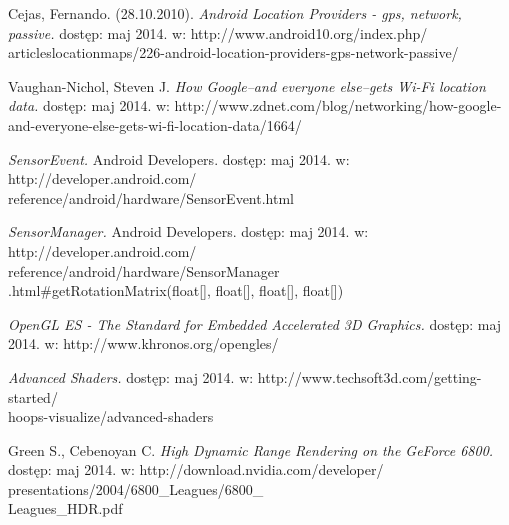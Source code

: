 \documentclass[a4paper,twocolumn,11pt]{article}
\begin{document}
\begin{thebibliography}{9}
 \small

  Cejas, Fernando.
                   (28.10.2010).
                   \emph{Android Location Providers - gps, network, passive.}
                   dostęp: maj 2014.
                   w: http://www.android10.org/index.php/\\articleslocationmaps/226-android-location-providers-gps-network-passive/
 
  Vaughan-Nichol, Steven J.
                    \emph{How Google--and everyone else--gets Wi-Fi location data.}
                    dostęp: maj 2014.
                    w: http://www.zdnet.com/blog/networking/how-google-and-everyone-else-gets-wi-fi-location-data/1664/

  \emph{SensorEvent.}
                              Android Developers.
                              dostęp: maj 2014.
                              w: http://developer.android.com/\\reference/android/hardware/SensorEvent.html

  \emph{SensorManager.}
                              Android Developers.
                              dostęp: maj 2014.
                              w: http://developer.android.com/\\reference/android/hardware/SensorManager\\.html\#getRotationMatrix(float[], float[], float[], float[])

  \emph{OpenGL ES - The Standard for Embedded Accelerated 3D Graphics.}
                  dostęp: maj 2014.
                  w: http://www.khronos.org/opengles/

  \emph{Advanced Shaders.}
                  dostęp: maj 2014.
                  w: http://www.techsoft3d.com/getting-started/\\hoops-visualize/advanced-shaders

  Green S., Cebenoyan C.
                   \emph{High Dynamic Range Rendering on the GeForce 6800.}
                   dostęp: maj 2014.
                   w: http://download.nvidia.com/developer/\\presentations/2004/6800\_Leagues/6800\_\\Leagues\_HDR.pdf

\end{thebibliography}
\end{document}
